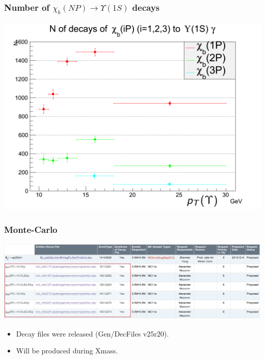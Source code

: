 \documentclass{beamer}
\begin{document}
\begin{frame}
\frametitle{Number of $\chi_b(NP) \rightarrow \Upsilon(1S)$ decays}
\includegraphics[width=.9\textwidth]{images/spectr.png}
\end{frame}
\begin{frame}

\frametitle{Monte-Carlo}
\includegraphics[width=.9\textwidth]{images/mcdkfiles.png}
\begin{itemize}
  \item Decay files were released (Gen/DecFiles v25r20).
  \item Will be produced during Xmass.
\end{itemize}
\end{frame}
\end{document}
